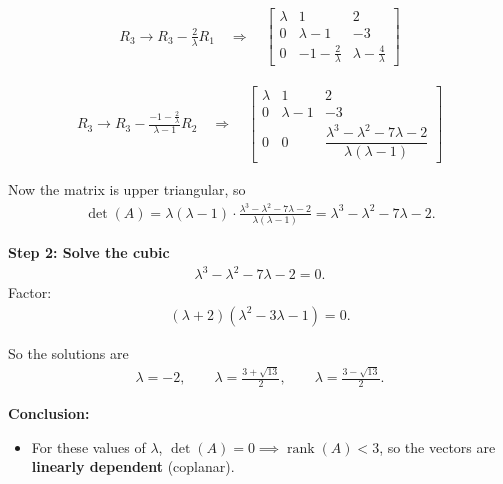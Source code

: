 \documentclass[journal]{IEEEtran}
\begin{document}
\begin{align}
R_3 \to R_3 - \tfrac{2}{\lambda}R_1 \quad \Rightarrow \quad
\begin{bmatrix}
\lambda & 1 & 2 \\
0 & \lambda-1 & -3 \\
0 & -1-\tfrac{2}{\lambda} & \lambda - \tfrac{4}{\lambda}
\end{bmatrix}
\end{align}

\begin{align}
R_3 \to R_3 - \frac{-1-\tfrac{2}{\lambda}}{\lambda-1}R_2
\quad \Rightarrow \quad
\begin{bmatrix}
\lambda & 1 & 2 \\
0 & \lambda-1 & -3 \\
0 & 0 & \dfrac{\lambda^3-\lambda^2-7\lambda-2}{\lambda(\lambda-1)}
\end{bmatrix}
\end{align}

Now the matrix is upper triangular, so
\begin{align}
\det(A) = \lambda(\lambda-1)\cdot \frac{\lambda^3-\lambda^2-7\lambda-2}{\lambda(\lambda-1)} 
= \lambda^3 - \lambda^2 - 7\lambda - 2.
\end{align}

\bigskip

\textbf{Step 2: Solve the cubic}  
\begin{align}
\lambda^3 - \lambda^2 - 7\lambda - 2 = 0.
\end{align}
Factor:
\begin{align}
(\lambda+2)(\lambda^2 - 3\lambda - 1) = 0.
\end{align}

So the solutions are
\begin{align}
\lambda = -2, \qquad \lambda = \frac{3+\sqrt{13}}{2}, \qquad \lambda = \frac{3-\sqrt{13}}{2}.
\end{align}

\bigskip
\textbf{Conclusion:}  
\begin{itemize}
\item For these values of $\lambda$, $\det(A)=0 \implies \operatorname{rank}(A)<3$, so the vectors are \textbf{linearly dependent} (coplanar).
\end{itemize}
\end{document}
